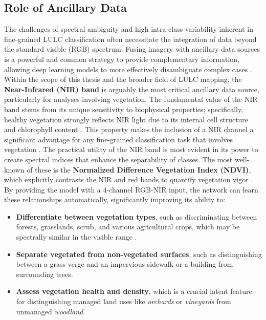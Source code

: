 \documentclass{report}
\begin{document}
\subsection{Role of Ancillary Data}
The challenges of spectral ambiguity and high intra-class variability inherent in fine-grained LULC classification often necessitate the integration of data beyond the standard visible (RGB) spectrum. Fusing imagery with ancillary data sources is a powerful and common strategy to provide complementary information, allowing deep learning models to more effectively disambiguate complex cases \parencites[p.~1552f.]{AudebertEtAlJointLearningEarthObservationOpenStreetMapDataGetFasterBetterSemanticMaps2017}.
Within the scope of this thesis and the broader field of LULC mapping, the \textbf{Near-Infrared (NIR) band} is arguably the most critical ancillary data source, particularly for analyses involving vegetation. The fundamental value of the NIR band stems from its unique sensitivity to biophysical properties; specifically, healthy vegetation strongly reflects NIR light due to its internal cell structure and chlorophyll content \parencites[p.~180ff.]{LuoEtAlSemanticsegmentationagriculturalimagessurvey2024}. This property makes the inclusion of a NIR channel a significant advantage for any fine-grained classification task that involves vegetation \parencite[p.~2]{SertelEtAlLandUseLandCoverMappingUsingDeepLearningBasedSegmentationApproachesVHRWorldview3Images2022}.
The practical utility of the NIR band is most evident in its power to create spectral indices that enhance the separability of classes. The most well-known of these is the \textbf{Normalized Difference Vegetation Index (NDVI)}, which explicitly contrasts the NIR and red bands to quantify vegetation vigor \parencites[p.~10]{TalukdarEtAlLandUseLandCoverClassificationMachineLearningClassifiersSatelliteObservationsReview2020}. By providing the model with a 4-channel RGB-NIR input, the network can learn these relationships automatically, significantly improving its ability to:
\begin{itemize}
    \item \textbf{Differentiate between vegetation types}, such as discriminating between forests, grasslands, scrub, and various agricultural crops, which may be spectrally similar in the visible range \parencites[p.~180]{LuoEtAlSemanticsegmentationagriculturalimagessurvey2024}.
    \item \textbf{Separate vegetated from non-vegetated surfaces}, such as distinguishing between a grass verge and an impervious sidewalk or a building from surrounding trees.
    \item \textbf{Assess vegetation health and density}, which is a crucial latent feature for distinguishing managed land uses like \textit{orchards} or \textit{vineyards} from unmanaged \textit{woodland}.
\end{itemize}
\end{document}
